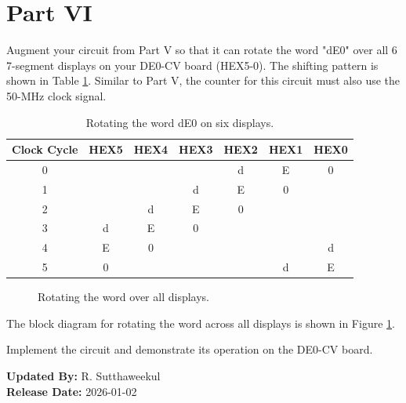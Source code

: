 \documentclass{article}
\begin{document}
\section*{Part VI}

Augment your circuit from Part V so that it can rotate the word "dE0" over all 6 7-segment displays on your DE0-CV board (HEX5-0). The shifting pattern is shown in Table \ref{tab:rotate_large_pattern}. Similar to Part V, the counter for this circuit must also use the 50-MHz clock signal.

\begin{table}[H]
    \centering
    \begin{tabular}{|c|c|c|c|c|c|c|}
    \hline
    Clock Cycle & HEX5 & HEX4 & HEX3 & HEX2 & HEX1 & HEX0 \\
    \hline
    0 &   &   &   & d & E & 0 \\
    1 &   &   & d & E & 0 &   \\
    2 &   & d & E & 0 &   &   \\
    3 & d & E & 0 &   &   &   \\
    4 & E & 0 &   &   &   & d \\
    5 & 0 &   &   &   & d & E \\
    \hline
    \end{tabular}
    \caption{Rotating the word dE0 on six displays.}
    \label{tab:rotate_large_pattern}
\end{table}

\begin{figure}[H]
    \centering
    
    \caption{Rotating the word over all displays.}
    \label{fig:rotate_large}
\end{figure}

The block diagram for rotating the word across all displays is shown in Figure \ref{fig:rotate_large}.

Implement the circuit and demonstrate its operation on the DE0-CV board.

\vspace{1cm}
\noindent \textbf{Updated By:} R. Sutthaweekul \\
\textbf{Release Date:} 2026-01-02
\end{document}
